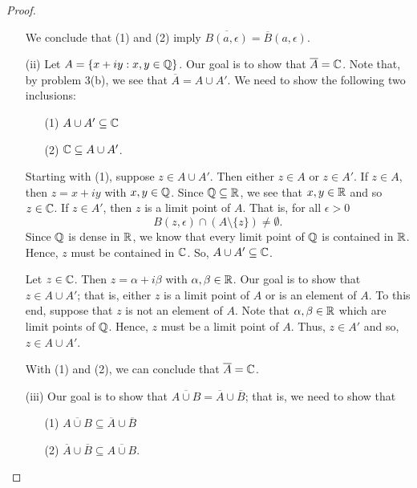 \documentclass[a4paper]{article}
\begin{document}
\begin{proof}
\begin{enumerate}
    We conclude that (1) and (2) imply \( \overline{B(a,\epsilon)} = \overline{B}(a,\epsilon) \).
\item[(ii)] Let \( A = \{ x + iy : x,y \in \mathbb{Q}  \}  \). Our goal is to show that \( \overline{A } = \mathbb{C}  \). Note that, by problem 3(b), we see that \( \overline{A} = A \cup A'  \). We need to show the following two inclusions:
    \begin{enumerate}
        \item[(1)] \( A \cup A' \subseteq  \mathbb{C}  \)
        \item[(2)] \( \mathbb{C} \subseteq  A \cup A' \).
    \end{enumerate}
    Starting with (1), suppose \( z \in A \cup A' \). Then either \( z \in A  \) or \( z \in A' \). If \( z \in A  \), then \( z = x + iy  \) with \( x,y \in \mathbb{Q}  \). Since \( \mathbb{Q} \subseteq  \mathbb{R}  \), we see that \( x,y \in \mathbb{R}  \) and so \( z \in \mathbb{C}  \). If \( z \in A' \), then \( z  \) is a limit point of \( A \). That is, for all \( \epsilon > 0  \) 
    \[  B(z,\epsilon) \cap (A \setminus \{ z \} ) \neq \emptyset.  \]
    Since \( \mathbb{Q}  \) is dense in \( \mathbb{R}  \), we know that every limit point of \( \mathbb{Q}  \) is contained in \( \mathbb{R}  \). Hence, \( z  \) must be contained in \( \mathbb{C}  \). So, \( A \cup A' \subseteq  \mathbb{C}  \). 

    Let \( z \in \mathbb{C}  \). Then \( z = \alpha + i \beta  \) with \( \alpha, \beta \in \mathbb{R}  \). Our goal is to show that \( z \in A \cup A' \); that is, either \( z  \) is a limit point of \( A  \) or is an element of \( A  \). To this end, suppose that \( z  \) is not an element of \( A  \). Note that \( \alpha, \beta \in \mathbb{R}  \) which are limit points of \( \mathbb{Q}  \). Hence, \( z  \) must be a limit point of \( A  \). Thus, \( z \in A' \) and so, \( z \in A \cup A' \).

    With (1) and (2), we can conclude that \( \overline{A} =\mathbb{C}  \).

\item[(iii)] Our goal is to show that \( \overline{A \cup B} = \overline{A} \cup \overline{B} \); that is, we need to show that  
    \begin{enumerate}
        \item[(1)] \( \overline{A \cup B} \subseteq  \overline{A} \cup \overline{B} \)
        \item[(2)] \( \overline{A} \cup \overline{B} \subseteq \overline{A \cup B} \).
    \end{enumerate}


\end{enumerate}
\end{proof}
\end{document}
